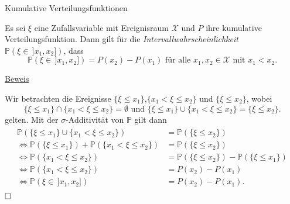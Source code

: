 \documentclass[
  8pt,
  ignorenonframetext,
]{beamer}
\begin{document}
\begin{frame}{Kumulative Verteilungsfunktionen}
\protect\hypertarget{kumulative-verteilungsfunktionen-2}{}
\small
\begin{theorem}[Intervallwahrscheinlichkeiten]
\justifying
\normalfont
Es sei $\xi$ eine Zufallsvariable mit Ereignisraum $\mathcal{X}$ und $P$ ihre
kumulative Verteilungsfunktion. Dann gilt für die \textit{Intervallwahrscheinlichkeit}
$\mathbb{P}(\xi \in \,]x_1,x_2])$, dass
\begin{equation}
\mathbb{P}(\xi \in \, ]x_1,x_2]) = P(x_2) - P(x_1)
\mbox{ für alle } x_1,x_2 \in \mathcal{X}
\mbox{ mit } x_1 < x_2.
\end{equation}
\end{theorem}

\footnotesize

\underline{Beweis} \vspace{1mm}

Wir betrachten die Ereignisse
\(\{\xi \le x_1\}\),\(\{x_1 < \xi \le x_2\}\) und \(\{\xi \le x_2\}\),
wobei \begin{equation}
\{\xi \le x_1\} \cap \{x_1 < \xi \le x_2\} = \emptyset
\mbox{ und }
\{\xi \le x_1\} \cup \{x_1 < \xi \le x_2\} = \{\xi \le x_2\}.
\end{equation} gelten. Mit der \(\sigma\)-Additivität von \(\mathbb{P}\)
gilt dann \begin{align}
\begin{split}
\mathbb{P}(\{\xi \le x_1\} \cup \{x_1 < \xi \le x_2\}) & = \mathbb{P}(\{\xi \le x_2\})              \\
\Leftrightarrow
\mathbb{P}(\{\xi \le x_1\}) + \mathbb{P}(\{x_1 < \xi \le x_2\}) & = \mathbb{P}(\{\xi \le x_2\})         \\
\Leftrightarrow
\mathbb{P}(\{x_1 < \xi \le x_2\}) & = \mathbb{P}(\{\xi \le x_2\}) - \mathbb{P}(\{\xi \le x_1\})         \\
\Leftrightarrow
\mathbb{P}(\{x_1 < \xi \le x_2\}) & = P(x_2) - P(x_1)                                           \\
\Leftrightarrow
\mathbb{P}(\xi \in \,]x_1,x_2]) & = P(x_2) - P(x_1).
\end{split}
\end{align} \(\hfill \Box\)
\end{frame}
\end{document}
